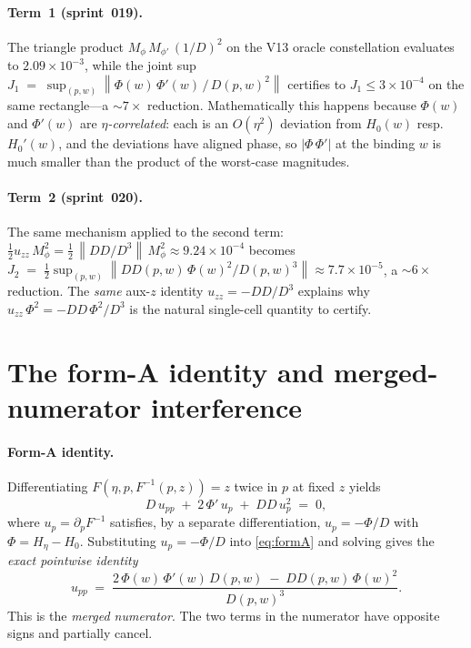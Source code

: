 \documentclass[11pt]{article}
\theoremstyle{definition}
\newcommand{\Heta}{H_{\eta}}
\newcommand{\Phizz}{\Phi}
\newcommand{\Fmap}{F}
\newcommand{\Finvmap}{F^{-1}}
\newcommand{\norm}[1]{\left\lVert#1\right\rVert}
\begin{document}
\paragraph{Term~1 (sprint~019).}
The triangle product
\(
M_\phi\,M_{\phi'}\,(1/D)^2
\)
on the V13 oracle constellation evaluates to $2.09\times 10^{-3}$, while the joint
sup
\(
J_1 \;=\; \sup_{(p,w)} \norm{\Phizz(w)\,\Phizz'(w)\,/\,D(p,w)^2}
\)
certifies to $J_1 \le 3\times 10^{-4}$ on the same rectangle---a $\sim 7\times$
reduction. Mathematically this happens because $\Phi(w)$ and $\Phi'(w)$ are
\emph{$\eta$-correlated}: each is an $O(\eta^2)$ deviation from
$H_0(w)$ resp.\ $H_0'(w)$, and the deviations have aligned phase, so $|\Phi\,\Phi'|$ at
the binding $w$ is much smaller than the product of the worst-case magnitudes.

\paragraph{Term~2 (sprint~020).}
The same mechanism applied to the second term:
\(
   \tfrac12 u_{zz}\,M_\phi^2 = \tfrac12\,\norm{DD/D^3}\,M_\phi^2 \approx 9.24\times 10^{-4}
\)
becomes
\(
   J_2 \;=\;\tfrac12\sup_{(p,w)} \norm{ DD(p,w)\,\Phi(w)^2 / D(p,w)^3 } \approx 7.7\times 10^{-5}
\),
a $\sim 6\times$ reduction. The \emph{same} aux-$z$ identity $u_{zz} = -DD/D^3$
explains why $u_{zz}\,\Phi^2 = -DD\,\Phi^2/D^3$ is the natural single-cell
quantity to certify.

\bigskip

\section{The form-A identity and merged-numerator interference}\label{sec:formA-merged}

\paragraph{Form-A identity.}
Differentiating $\Fmap(\eta,p,\Finvmap(p,z))=z$ twice in $p$ at fixed $z$ yields
\begin{equation}\label{eq:formA}
   D\,u_{pp} \;+\; 2\,\Phi'\,u_p \;+\; DD\,u_p^2 \;=\; 0,
\end{equation}
where $u_p = \partial_p \Finvmap$ satisfies, by a separate differentiation,
$u_p = -\Phi/D$ with $\Phi = \Heta - H_0$. Substituting $u_p = -\Phi/D$ into
\eqref{eq:formA} and solving gives the \emph{exact pointwise identity}
\begin{equation}\label{eq:upp-merged}
   u_{pp}
   \;=\;
   \frac{2\,\Phi(w)\,\Phi'(w)\,D(p,w)\;-\;DD(p,w)\,\Phi(w)^2}{D(p,w)^3}.
\end{equation}
This is the \emph{merged numerator}. The two terms in the numerator have opposite
signs and partially cancel.
\end{document}
